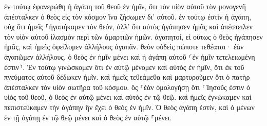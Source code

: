 \documentclass{openreader}
\begin{document}
ἐν τούτῳ ἐφανερώθη ἡ ἀγάπη τοῦ θεοῦ ἐν ἡμῖν, ὅτι τὸν υἱὸν αὐτοῦ τὸν μονογενῆ ἀπέσταλκεν ὁ θεὸς εἰς τὸν κόσμον ἵνα ζήσωμεν δι’ αὐτοῦ. 
ἐν τούτῳ ἐστὶν ἡ ἀγάπη, οὐχ ὅτι ἡμεῖς ⸀ἠγαπήκαμεν τὸν θεόν, ἀλλ’ ὅτι αὐτὸς ἠγάπησεν ἡμᾶς καὶ ἀπέστειλεν τὸν υἱὸν αὐτοῦ ἱλασμὸν περὶ τῶν ἁμαρτιῶν ἡμῶν. 
ἀγαπητοί, εἰ οὕτως ὁ θεὸς ἠγάπησεν ἡμᾶς, καὶ ἡμεῖς ὀφείλομεν ἀλλήλους ἀγαπᾶν. 
θεὸν οὐδεὶς πώποτε τεθέαται· ἐὰν ἀγαπῶμεν ἀλλήλους, ὁ θεὸς ἐν ἡμῖν μένει καὶ ἡ ἀγάπη αὐτοῦ ⸂ἐν ἡμῖν τετελειωμένη ἐστιν⸃. 
Ἐν τούτῳ γινώσκομεν ὅτι ἐν αὐτῷ μένομεν καὶ αὐτὸς ἐν ἡμῖν, ὅτι ἐκ τοῦ πνεύματος αὐτοῦ δέδωκεν ἡμῖν. 
καὶ ἡμεῖς τεθεάμεθα καὶ μαρτυροῦμεν ὅτι ὁ πατὴρ ἀπέσταλκεν τὸν υἱὸν σωτῆρα τοῦ κόσμου. 
ὃς ⸀ἐὰν ὁμολογήσῃ ὅτι ⸀Ἰησοῦς ἐστιν ὁ υἱὸς τοῦ θεοῦ, ὁ θεὸς ἐν αὐτῷ μένει καὶ αὐτὸς ἐν τῷ θεῷ. 
καὶ ἡμεῖς ἐγνώκαμεν καὶ πεπιστεύκαμεν τὴν ἀγάπην ἣν ἔχει ὁ θεὸς ἐν ἡμῖν. Ὁ θεὸς ἀγάπη ἐστίν, καὶ ὁ μένων ἐν τῇ ἀγάπῃ ἐν τῷ θεῷ μένει καὶ ὁ θεὸς ἐν αὐτῷ ⸀μένει. 
\end{document}
